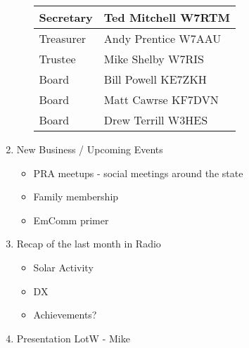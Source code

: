 \documentclass[letter,11pt]{extarticle}
\begin{document}
\begin{enumerate}
\begin{itemize}
\begin{tabular}{|l|l|}
						Secretary & Ted Mitchell W7RTM \\ \hline
						Treasurer & Andy Prentice W7AAU \\ \hline
						Trustee & Mike Shelby W7RIS   \\ \hline
						Board & Bill Powell KE7ZKH \\ \hline
						Board & Matt Cawrse KF7DVN \\ \hline
						Board & Drew Terrill W3HES\\ \hline
					\end{tabular}
			\end{itemize}
		\item  New Business / Upcoming Events
			\begin{itemize}
				\item PRA meetups - social meetings around the state
				\item Family membership
				\item EmComm primer
			\end{itemize}
		\item Recap of the last month in Radio
			\begin{itemize}
				\item Solar Activity
				\item DX
				\item Achievements?
			\end{itemize}
		\item  Presentation LotW - Mike
	\end{enumerate}


	
	\subsection*{}
	
\end{document}
